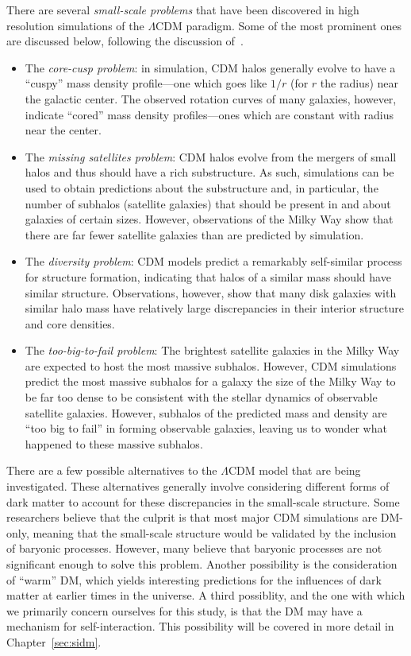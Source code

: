 There are several \textit{small-scale problems} that have been discovered in
high resolution simulations of the $\Lambda$CDM paradigm. Some of the most
prominent ones are discussed below, following the discussion
of~\cite{tulin_dark_2018}.
\begin{itemize}
    \item The \textit{core-cusp problem}: in simulation, CDM halos generally
    evolve to have a ``cuspy'' mass density profile---one which goes like $1/r$
    (for $r$ the radius) near the galactic center. The observed rotation curves
    of many galaxies, however, indicate ``cored'' mass density profiles---ones
    which are constant with radius near the center. 

    \item The \textit{missing satellites problem}: CDM halos evolve from the
    mergers of small halos and thus should have a rich substructure. As such,
    simulations can be used to obtain predictions about the substructure and, in
    particular, the number of subhalos (satellite galaxies) that should be
    present in and about galaxies of certain sizes. However, observations of the
    Milky Way show that there are far fewer satellite galaxies than are
    predicted by simulation.

    \item The \textit{diversity problem}: CDM models predict a remarkably
    self-similar process for structure formation, indicating that halos of a
    similar mass should have similar structure. Observations, however, show that
    many disk galaxies with similar halo mass have relatively large
    discrepancies in their interior structure and core densities.

    \item The \textit{too-big-to-fail problem}: The brightest satellite galaxies
    in the Milky Way are expected to host the most massive subhalos. However,
    CDM simulations predict the most massive subhalos for a galaxy the size of
    the Milky Way to be far too dense to be consistent with the stellar dynamics
    of observable satellite galaxies. However, subhalos of the predicted mass
    and density are ``too big to fail'' in forming observable galaxies, leaving
    us to wonder what happened to these massive subhalos.
\end{itemize}

There are a few possible alternatives to the $\Lambda$CDM model that are being
investigated. These alternatives generally involve considering different forms
of dark matter to account for these discrepancies in the small-scale structure.
Some researchers believe that the culprit is that most major CDM simulations
are DM-only, meaning that the small-scale structure would be validated by the
inclusion of baryonic processes. However, many believe that baryonic processes
are not significant enough to solve this problem. Another possibility is the
consideration of ``warm'' DM, which yields interesting predictions for the
influences of dark matter at earlier times in the universe. A third possiblity,
and the one with which we primarily concern ourselves for this study, is that
the DM may have a mechanism for self-interaction. This possibility will be
covered in more detail in Chapter~\ref{sec:sidm}.


